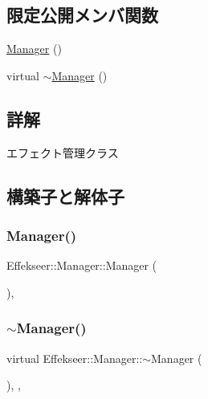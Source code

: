 \subsection*{限定公開メンバ関数}
\begin{DoxyCompactItemize}
\item 
\mbox{\hyperlink{class_effekseer_1_1_manager_a95f452d6946c93cece08532dc73e8fa2}{Manager}} ()
\item 
virtual \mbox{\hyperlink{class_effekseer_1_1_manager_af620a54ced00bb2d9f7b7d919e89fc98}{$\sim$\+Manager}} ()
\end{DoxyCompactItemize}


\subsection{詳解}
エフェクト管理クラス 

\subsection{構築子と解体子}
\mbox{\label{class_effekseer_1_1_manager_a95f452d6946c93cece08532dc73e8fa2}} 
\subsubsection{\texorpdfstring{Manager()}{Manager()}}
{\footnotesize\ttfamily Effekseer\+::\+Manager\+::\+Manager (\begin{DoxyParamCaption}{ }\end{DoxyParamCaption})\hspace{0.3cm}{\ttfamily [inline]}, {\ttfamily [protected]}}

\mbox{\label{class_effekseer_1_1_manager_af620a54ced00bb2d9f7b7d919e89fc98}} 
\subsubsection{\texorpdfstring{$\sim$\+Manager()}{~Manager()}}
{\footnotesize\ttfamily virtual Effekseer\+::\+Manager\+::$\sim$\+Manager (\begin{DoxyParamCaption}{ }\end{DoxyParamCaption})\hspace{0.3cm}{\ttfamily [inline]}, {\ttfamily [protected]}, {\ttfamily [virtual]}}



